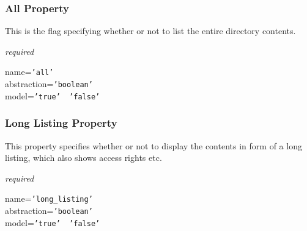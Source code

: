 \subsubsection{All Property}

This is the flag specifying whether or not to list the entire directory contents.

\emph{required}

name=\texttt{'all'}\\
abstraction=\texttt{'boolean'}\\
model=\texttt{'true' \vline\ 'false'}

\subsubsection{Long Listing Property}

This property specifies whether or not to display the contents in form of a
long listing, which also shows access rights etc.

\emph{required}

name=\texttt{'long\_listing'}\\
abstraction=\texttt{'boolean'}\\
model=\texttt{'true' \vline\ 'false'}
